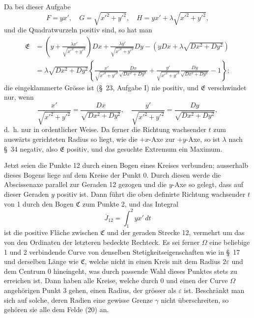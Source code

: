 \documentclass[11pt,a4paper,leqno]{article}
\begin{document}
Da bei dieser Aufgabe
\[
F=yx',\quad G=\sqrt{x'^2+y'^2},\quad H=yx'+\lambda\sqrt{x'^2+y'^2},
\]
und die Quadratwurzeln positiv sind, so hat man
\[
\begin{aligned}
\mathfrak{E}&=\left(y+\frac{\lambda x'}{\sqrt{x'^2+y'^2}}\right)Dx+
\frac{\lambda y'}{\sqrt{x'^2+y'^2}}Dy-
\left(yDx+\lambda\sqrt{Dx^2+Dy^2}\right)\\
&=\lambda\sqrt{Dx^2+Dy^2}\left\{\frac{x'}{\sqrt{x'^2+y'^2}}\frac{Dx}{\sqrt{Dx^2+Dy^2}}+
\frac{y'}{\sqrt{x'^2+y'^2}}\frac{Dy}{\sqrt{Dx^2+Dy^2}}-1\right\};
\end{aligned}
\]
die eingeklammerte Grösse ist (\S~23, Aufgabe I) nie positiv, und $\mathfrak{E}$ verschwindet nur, wenn
\[
\frac{x'}{\sqrt{x'^2+y'^2}}=\frac{Dx}{\sqrt{Dx^2+Dy^2}},\quad
\frac{y'}{\sqrt{x'^2+y'^2}}=\frac{Dy}{\sqrt{Dx^2+Dy^2}},
\]
d.~h. nur in ordentlicher Weise. Da ferner die Richtung wachsender $t$ zum auswärts gerichteten Radius so liegt, wie die
$+x$-Axe zur $+y$-Axe, so ist $\lambda$ nach \S~34 negativ, also $\mathfrak{E}$ positiv, und das gesuchte Extremum ein Maximum.

Jetzt seien die Punkte 12 durch einen Bogen eines Kreises verbunden; ausserhalb dieses Bogens liege auf dem Kreise der Punkt 0. Durch diesen werde die Abscissenaxe parallel zur Geraden 12 gezogen und die $y$-Axe so gelegt, dass auf dieser Geraden $y$ positiv ist. Dann führt die oben definirte Richtung wachsender $t$ von 1 durch den Bogen $\mathfrak{C}$ zum Punkte 2, und das Integral
\[
\overline{J}_{12}=\int_1^2 yx'\,dt
\]
ist die positive Fläche zwischen $\mathfrak{C}$ und der geraden Strecke 12, vermehrt um das von den Ordinaten der letzteren bedeckte Rechteck. Es sei ferner $\Omega$ eine beliebige 1 und 2 verbindende Curve von denselben Stetigkeitseigenschaften wie in \S~17 und derselben Länge wie $\mathfrak{C}$, welche nicht in einen Kreis mit dem Radius $2\varepsilon$ und dem Centrum 0 hineingeht, was durch passende Wahl dieses Punktes stets zu erreichen ist. Dann haben alle Kreise, welche durch 0 und einen der Curve $\Omega$ angehörigen Punkt 3 gehen, einen Radius, der grösser als $\varepsilon$ ist. Beschränkt man sich auf solche, deren Radien eine gewisse Grenze $\gamma$ nicht überschreiten, so gehören sie alle dem Felde (20) an.
\end{document}
